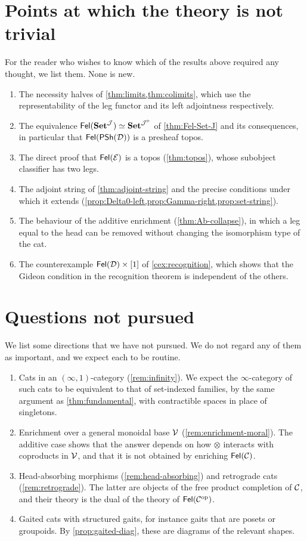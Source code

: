 \section{Points at which the theory is not trivial}

For the reader who wishes to know which of the results above required any
thought, we list them. None is new.
\begin{enumerate}
\item The necessity halves of \cref{thm:limits,thm:colimits}, which use the
  representability of the leg functor and its left adjointness respectively.
\item The equivalence $\mathsf{Fel}(\mathbf{Set}^{\mathcal{J}})\simeq\mathbf{Set}^{\mathcal{J}^{\triangleright}}$ of
  \cref{thm:Fel-Set-J} and its consequences, in particular that $\mathsf{Fel}(\mathsf{PSh}(\mathcal{D}))$
  is a presheaf topos.
\item The direct proof that $\mathsf{Fel}(\mathcal{E})$ is a topos (\cref{thm:topos}), whose
  subobject classifier has two legs.
\item The adjoint string of \cref{thm:adjoint-string} and the precise conditions
  under which it extends (\cref{prop:Delta0-left,prop:Gamma-right,prop:set-string}).
\item The behaviour of the additive enrichment (\cref{thm:Ab-collapse}), in which
  a leg equal to the head can be removed without changing the isomorphism type
  of the cat.
\item The counterexample $\mathsf{Fel}(\mathcal{D})\times[1]$ of \cref{cex:recognition}, which
  shows that the Gideon condition in the recognition theorem is independent of
  the others.
\end{enumerate}

\section{Questions not pursued}

We list some directions that we have not pursued. We do not regard any of them
as important, and we expect each to be routine.
\begin{enumerate}
\item Cats in an $(\infty,1)$-category (\cref{rem:infinity}). We expect the
  $\infty$-category of such cats to be equivalent to that of set-indexed
  families, by the same argument as \cref{thm:fundamental}, with contractible
  spaces in place of singletons.
\item Enrichment over a general monoidal base $\mathcal{V}$ (\cref{rem:enrichment-moral}).
  The additive case shows that the answer depends on how $\otimes$ interacts with
  coproducts in $\mathcal{V}$, and that it is not obtained by enriching $\mathsf{Fel}(\mathcal{C})$.
\item Head-absorbing morphisms (\cref{rem:head-absorbing}) and retrograde cats
  (\cref{rem:retrograde}). The latter are objects of the free product
  completion of $\mathcal{C}$, and their theory is the dual of the theory of
  $\mathsf{Fel}(\mathcal{C}^{\mathrm{op}})$.
\item Gaited cats with structured gaits, for instance gaits that are posets or
  groupoids. By \cref{prop:gaited-diag}, these are diagrams of the relevant
  shapes.
\end{enumerate}

